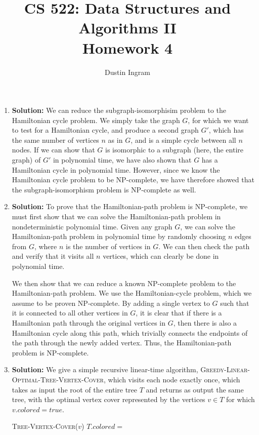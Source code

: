 \documentclass{article}
\title{CS 522: Data Structures and Algorithms II \\ Homework 4}
\author{Dustin Ingram}
\begin{document}
\maketitle
\begin{enumerate}
    \item \textbf{Solution:}
    We can reduce the subgraph-isomorphisim problem to the Hamiltonian cycle
    problem. We simply take the graph $G$, for which we want to test for a
    Hamiltonian cycle, and produce a second graph $G'$, which has the same
    number of vertices $n$ as in $G$, and is a simple cycle between all $n$
    nodes. If we can show that $G$ is isomorphic to a subgraph (here, the entire
    graph) of $G'$ in polynomial time, we have also shown that $G$ has a
    Hamiltonian cycle in polynomial time. However, since we know the Hamiltonian
    cycle problem to be NP-complete, we have therefore showed that the
    subgraph-isomorphism problem is NP-complete as well.

    \item \textbf{Solution:}
    To prove that the Hamiltonian-path problem is NP-complete, we must first
    show that we can solve the Hamiltonian-path problem in nondeterministic
    polynomial time. Given any graph $G$, we can solve the Hamiltonian-path
    problem in polynomial time by randomly choosing $n$ edges from $G$, where
    $n$ is the number of vertices in $G$. We can then check the path and verify
    that it visits all $n$ vertices, which can clearly be done in polynomial
    time.

    We then show that we can reduce a known NP-complete problem to the
    Hamiltonian-path problem. We use the Hamiltonian-cycle problem, which we
    assume to be proven NP-complete. By adding a single vertex to $G$ such that
    it is connected to all other vertices in $G$, it is clear that if there is a
    Hamiltonian path through the original vertices in $G$, then there is also a
    Hamiltonian cycle along this path, which trivially connects the endpoints of
    the path through the newly added vertex. Thus, the Hamiltonian-path problem
    is NP-complete.

    \item \textbf{Solution:}
    We give a simple recursive linear-time algorithm,
    \textsc{Greedy-Linear-Optimal-Tree-Vertex-Cover}, which visits each node
    exactly once, which takes as input the root of the entire tree $T$ and
    returns as output the same tree, with the optimal vertex cover represented
    by the vertices $v \in T$ for which $v.colored = true$.
    \begin{algorithm}[H]
        \begin{algorithmic}
            \caption{}
                \RETURN
            \ENDIF
                \STATE \textsc{Tree-Vertex-Cover($v$)}
                    \STATE $T.colored = $ \TRUE
                \ENDIF
            \ENDFOR
        \end{algorithmic}
    \end{algorithm}


\end{enumerate}
\end{document}
